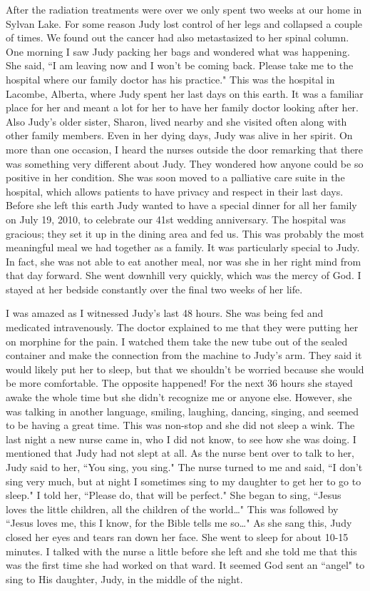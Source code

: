 \documentclass[oneside]{book}
\begin{document}
After the radiation treatments were over we only spent two weeks at our home in Sylvan Lake. For some reason Judy lost control of her legs and collapsed a couple of times. We found out the cancer had also metastasized to her spinal column. One morning I saw Judy packing her bags and wondered what was happening. She said, ``I am leaving now and I won't be coming back. Please take me to the hospital where our family doctor has his practice." This was the hospital in Lacombe, Alberta, where Judy spent her last days on this earth. It was a familiar place for her and meant a lot for her to have her family doctor looking after her. Also Judy's older sister, Sharon, lived nearby and she visited often along with other family members. Even in her dying days, Judy was alive in her spirit. On more than one occasion, I heard the nurses outside the door remarking that there was something very different about Judy. They wondered how anyone could be so positive in her condition. She was soon moved to a palliative care suite in the hospital, which allows patients to have privacy and respect in their last days. Before she left this earth Judy wanted to have a special dinner for all her family on July 19, 2010, to celebrate our 41st wedding anniversary. The hospital was gracious; they set it up in the dining area and fed us. This was probably the most meaningful meal we had together as a family. It was particularly special to Judy. In fact, she was not able to eat another meal, nor was she in her right mind from that day forward. She went downhill very quickly, which was the mercy of God. I stayed at her bedside constantly over the final two weeks of her life. 

I was amazed as I witnessed Judy's last 48 hours. She was being fed and medicated intravenously. The doctor explained to me that they were putting her on morphine for the pain. I watched them take the new tube out of the sealed container and make the connection from the machine to Judy's arm. They said it would likely put her to sleep, but that we shouldn't be worried because she would be more comfortable. The opposite happened! For the next 36 hours she stayed awake the whole time but she didn't recognize me or anyone else. However, she was talking in another language, smiling, laughing, dancing, singing, and seemed to be having a great time. This was non-stop and she did not sleep a wink. The last night a new nurse came in, who I did not know, to see how she was doing. I mentioned that Judy had not slept at all. As the nurse bent over to talk to her, Judy said to her, ``You sing, you sing." The nurse turned to me and said, ``I don't sing very much, but at night I sometimes sing to my daughter to get her to go to sleep." I told her, ``Please do, that will be perfect." She began to sing, ``Jesus loves the little children, all the children of the world…" This was followed by ``Jesus loves me, this I know, for the Bible tells me so…" As she sang this, Judy closed her eyes and tears ran down her face. She went to sleep for about 10-15 minutes. I talked with the nurse a little before she left and she told me that this was the first time she had worked on that ward. It seemed God sent an ``angel" to sing to His daughter, Judy, in the middle of the night. 
\end{document}
